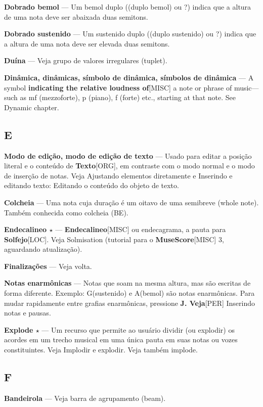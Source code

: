 \documentclass[a4paper,12pt]{article}
\begin{document}
\textbf{Dobrado bemol} --- Um bemol duplo ((duplo bemol) ou ?) indica que a altura de uma nota deve ser abaixada duas semitons.

\textbf{Dobrado sustenido} --- Um sustenido duplo ((duplo sustenido) ou ?) indica que a altura de uma nota deve ser elevada duas semitons.

\textbf{Duína} --- Veja grupo de valores irregulares (tuplet).

\textbf{Dinâmica, dinâmicas, símbolo de dinâmica, símbolos de dinâmica} --- A symbol \textbf{indicating the relative loudness of}\textsc{[MISC]} a note or phrase of music---such as mf (mezzoforte), p (piano), f (forte) etc., starting at that note. See Dynamic chapter.

\subsection*{E}
\textbf{Modo de edição, modo de edição de texto} --- Usado para editar a posição literal e o conteúdo de \textbf{Texto}\textsc{[ORG]}, em contraste com o modo normal e o modo de inserção de notas. Veja Ajustando elementos diretamente e Inserindo e editando texto: Editando o conteúdo do objeto de texto.

\textbf{Colcheia} --- Uma nota cuja duração é um oitavo de uma semibreve (whole note). Também conhecida como colcheia (BE).

\textbf{Endecalineo $\star$} --- \textbf{Endecalineo}\textsc{[MISC]} ou endecagrama, a pauta para \textbf{Solfejo}\textsc{[LOC]}. Veja Solmisation (tutorial para o \textbf{MuseScore}\textsc{[MISC]} 3, aguardando atualização).

\textbf{Finalizações} --- Veja volta.

\textbf{Notas enarmônicas} --- Notas que soam na mesma altura, mas são escritas de forma diferente. Exemplo: G(sustenido) e A(bemol) são notas enarmônicas. Para mudar rapidamente entre grafias enarmônicas, pressione \textbf{J. Veja}\textsc{[PER]} Inserindo notas e pausas.

\textbf{Explode $\star$} --- Um recurso que permite ao usuário dividir (ou explodir) os acordes em um trecho musical em uma única pauta em suas notas ou vozes constituintes. Veja Implodir e explodir. Veja também implode.

\subsection*{F}
\textbf{Bandeirola} --- Veja barra de agrupamento (beam).
\end{document}
